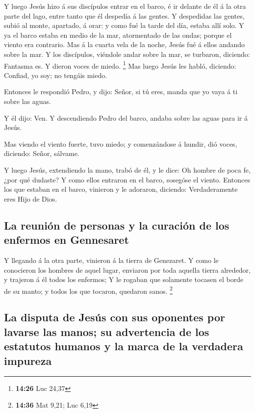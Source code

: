  Y luego Jesús hizo á sus discípulos entrar en el barco, é
ir delante de él á la otra parte del lago, entre tanto que él despedía á
las gentes.  Y despedidas las gentes, subió al monte,
apartado, á orar: y como fué la tarde del día, estaba allí solo.
 Y ya el barco estaba en medio de la mar, atormentado de
las ondas; porque el viento era contrario.  Mas á la cuarta
vela de la noche, Jesús fué á ellos andando sobre la mar. 
Y los discípulos, viéndole andar sobre la mar, se turbaron, diciendo:
Fantasma es. Y dieron voces de miedo. \footnote{\textbf{14:26} Luc 24,37}
 Mas luego Jesús les habló, diciendo: Confiad, yo soy; no
tengáis miedo.

 Entonces le respondió Pedro, y dijo: Señor, si tú eres,
manda que yo vaya á ti sobre las aguas.

 Y él dijo: Ven. Y descendiendo Pedro del barco, andaba
sobre las aguas para ir á Jesús.

 Mas viendo el viento fuerte, tuvo miedo; y comenzándose á
hundir, dió voces, diciendo: Señor, sálvame.

 Y luego Jesús, extendiendo la mano, trabó de él, y le
dice: Oh hombre de poca fe, ¿por qué dudaste?  Y como ellos
entraron en el barco, sosegóse el viento.  Entonces los que
estaban en el barco, vinieron y le adoraron, diciendo: Verdaderamente
eres Hijo de Dios.

\hypertarget{la-reuniuxf3n-de-personas-y-la-curaciuxf3n-de-los-enfermos-en-gennesaret}{%
\subsection{La reunión de personas y la curación de los enfermos en
Gennesaret}\label{la-reuniuxf3n-de-personas-y-la-curaciuxf3n-de-los-enfermos-en-gennesaret}}

 Y llegando á la otra parte, vinieron á la tierra de
Genezaret.  Y como le conocieron los hombres de aquel
lugar, enviaron por toda aquella tierra alrededor, y trajeron á él todos
los enfermos;  Y le rogaban que solamente tocasen el borde
de su manto; y todos los que tocaron, quedaron sanos. \footnote{\textbf{14:36}
  Mat 9,21; Luc 6,19}

\hypertarget{la-disputa-de-jesuxfas-con-sus-oponentes-por-lavarse-las-manos-su-advertencia-de-los-estatutos-humanos-y-la-marca-de-la-verdadera-impureza}{%
\subsection{La disputa de Jesús con sus oponentes por lavarse las manos;
su advertencia de los estatutos humanos y la marca de la verdadera
impureza}\label{la-disputa-de-jesuxfas-con-sus-oponentes-por-lavarse-las-manos-su-advertencia-de-los-estatutos-humanos-y-la-marca-de-la-verdadera-impureza}}

